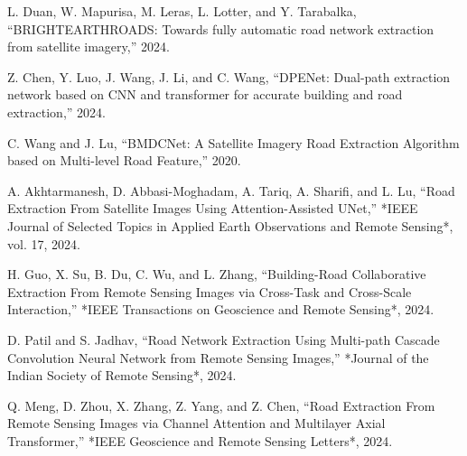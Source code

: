 \documentclass[11pt]{article}
\begin{document}
\begin{thebibliography}{99}
L. Duan, W. Mapurisa, M. Leras, L. Lotter, and Y. Tarabalka, “BRIGHTEARTHROADS: Towards fully automatic road network extraction from satellite imagery,” 2024.

Z. Chen, Y. Luo, J. Wang, J. Li, and C. Wang, “DPENet: Dual-path extraction network based on CNN and transformer for accurate building and road extraction,” 2024.

C. Wang and J. Lu, “BMDCNet: A Satellite Imagery Road Extraction Algorithm based on Multi-level Road Feature,” 2020.

A. Akhtarmanesh, D. Abbasi-Moghadam, A. Tariq, A. Sharifi, and L. Lu, “Road Extraction From Satellite Images Using Attention-Assisted UNet,” *IEEE Journal of Selected Topics in Applied Earth Observations and Remote Sensing*, vol. 17, 2024.

H. Guo, X. Su, B. Du, C. Wu, and L. Zhang, “Building-Road Collaborative Extraction From Remote Sensing Images via Cross-Task and Cross-Scale Interaction,” *IEEE Transactions on Geoscience and Remote Sensing*, 2024.

D. Patil and S. Jadhav, “Road Network Extraction Using Multi-path Cascade Convolution Neural Network from Remote Sensing Images,” *Journal of the Indian Society of Remote Sensing*, 2024.

Q. Meng, D. Zhou, X. Zhang, Z. Yang, and Z. Chen, “Road Extraction From Remote Sensing Images via Channel Attention and Multilayer Axial Transformer,” *IEEE Geoscience and Remote Sensing Letters*, 2024.

\end{thebibliography}
\end{document}
